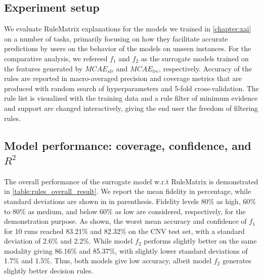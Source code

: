 \subsection{Experiment setup}
We evaluate RuleMatrix explanations for the models we trained in \cref{chapter:xai} on a number of tasks, primarily focusing on how they facilitate accurate predictions by users on the behavior of the models on unseen instances. For the comparative analysis, we refereed $f_1$ and $f_2$ as the surrogate models trained on the features generated by $MCAE_{slr}$ and $MCAE_{lrc}$, respectively.  
Accuracy of the rules are reported in macro-averaged precision and coverage metrics that are produced with random search of hyperparameters and 5-fold cross-validation. The rule list is visualized with the training data and a rule filter of minimum evidence and support are changed interactively, giving the end user the freedom of filtering rules. 

\subsection{Model performance: coverage, confidence, and $R^2$}
The overall performance of the surrogate model w.r.t RuleMatrix is demonstrated in \cref{table:rules_overall_result}. We report the mean fidelity in percentage, while standard deviations are shown in in parenthesis. Fidelity levels 80\% as high, 60\% to 80\% as medium, and below 60\% as low are considered, respectively, for the demonstration purpose. As shown, the worst mean accuracy and confidence of $f_1$ for 10 runs reached 83.21\% and 82.32\% on the CNV test set, with a standard deviation of 2.6\% and 2.2\%. While model $f_2$ performs slightly better on the same modality giving 86.16\% and 85.37\%, with slightly lower standard deviations of 1.7\% and 1.5\%. Thus, both models give low accuracy, albeit model $f_2$ generates slightly better decision rules. 

